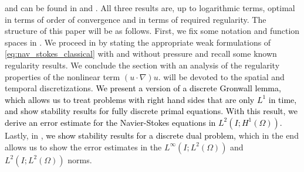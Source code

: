 \documentclass{m2an}
\newcommand\blue[1]{\textcolor{black}{#1}}
\newcommand{\ukh}{u_{kh}}
\begin{document}
and can be found in  and
.
All three results are, up to logarithmic terms, optimal in terms of order of convergence and in terms 
of required regularity.
The structure of this paper will be as follows.
First, we fix some notation and function spaces in .
We proceed in  by stating the appropriate weak formulations of
\eqref{eq:nav_stokes_classical}
with and without pressure and recall some known regularity results.
We conclude the section with an analysis of the regularity properties of 
the nonlinear term $(u \cdot \nabla) u$.
 will be devoted to the spatial and temporal discretizations.
\blue{We present a version of a discrete Gronwall lemma, which allows us to treat problems with
right hand sides that are only $L^1$ in time, and show stability results for fully discrete primal equations.
With this result, we derive an error estimate for the Navier-Stokes equations in $L^2(I;H^1(\Omega))$.}
Lastly, in ,
\blue{we show stability results for a discrete dual problem,}
which in the end allows us to show the error estimates in 
the $L^\infty(I;L^2(\Omega))$ and $L^2(I;L^2(\Omega))$ norms.
\end{document}
